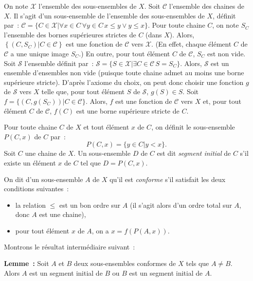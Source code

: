 On note $\mathcal{X}$ l'ensemble des sous-ensembles de $X$.
Soit $\mathcal{C}$ l'ensemble des chaines de $X$. 
Il s'agit d'un sous-ensemble de l'ensemble des sous-ensembles de $X$, définit par : $\mathcal{C} = \lbrace C \in \mathcal{X} \vert \forall x \in C \, \forall y \in C \, x \leq y \vee y \leq x \rbrace$.
Pour toute chaine $C$, on note $S_C$ l'ensemble des bornes supérieures strictes de $C$ (dans $X$). 
Alors, $\left\lbrace \left( C, S_C \right) \vert C \in \mathcal{C} \right\rbrace$ est une fonction de $\mathcal{C}$ vers $\mathcal{X}$. 
(En effet, chaque élément $C$ de $\mathcal{C}$ a une unique image $S_C$.)
En outre, pour tout élément $C$ de $\mathcal{C}$, $S_C$ est non vide. 
Soit $\mathcal{S}$ l'ensemble définit par : $\mathcal{S} = \lbrace S \in \mathcal{X} \vert \exists C \in \mathcal{C} \, S = S_C \rbrace$. 
Alors, $\mathcal{S}$ est un ensemble d'ensembles non vide (puisque toute chaine admet au moins une borne supérieure stricte). 
D'après l'axiome du choix, on peut donc choisir une fonction $g$ de $\mathcal{S}$ vers $X$ telle que, pour tout élément $S$
 de $\mathcal{S}$, $g(S) \in S$. 
Soit $f = \lbrace (C, g(S_C)) \vert C \in \mathcal{C} \rbrace$. 
Alors, $f$ est une fonction de $\mathcal{C}$ vers $X$ et, pour tout élément $C$ de $\mathcal{C}$, $f(C)$ est une borne supérieure stricte de $C$.

Pour toute chaine $C$ de $X$ et tout élément $x$ de $C$, on définit le sous-ensemble $P(C, x)$ de $C$ par : 
\begin{equation*}
    P(C, x) = \lbrace y \in C \vert y < x \rbrace.
\end{equation*}
Soit $C$ une chaine de $X$. 
Un sous-ensemble $D$ de $C$ est dit \textit{segment initial} de $C$ s'il existe un élément $x$ de $C$ tel que $D = P(C, x)$.

On dit d'un sous-ensemble $A$ de $X$ qu'il est \textit{conforme} s'il satisfait les deux conditions suivantes : 
\begin{itemize}[nosep]
    \item la relation $\leq$ est un bon ordre sur $A$ (il s'agit alors d'un ordre total sur $A$, donc $A$ est une chaine), 
    \item pour tout élément $x$ de $A$, on a $x = f(P(A,x))$. 
\end{itemize}

Montrons le résultat intermédiaire suivant : 

\medskip

\noindent\textbf{Lemme :} Soit $A$ et $B$ deux sous-ensembles conformes de $X$ tels que $A \neq B$.
    Alors $A$ est un segment initial de $B$ ou $B$ est un segment initial de $A$.


